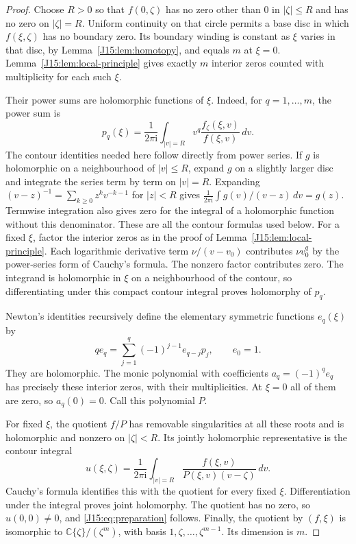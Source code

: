\documentclass[11pt,oneside]{report}
\theoremstyle{definition}
\numberwithin{equation}{section}
\newcommand{\C}{\mathbb C}
\newcommand{\ii}{\mathrm i}
\begin{document}
\begin{proof}
Choose $R>0$ so that $f(0,\zeta)$ has no zero other than $0$ in
$|\zeta|\le R$ and has no zero on $|\zeta|=R$.
Uniform continuity on that circle permits a base disc in which
$f(\xi,\zeta)$ has no boundary zero. Its boundary winding is constant
as $\xi$ varies in that disc, by Lemma~\ref{J15:lem:homotopy}, and equals
$m$ at $\xi=0$. Lemma~\ref{J15:lem:local-principle} gives exactly $m$
interior zeros counted with multiplicity for each such $\xi$.

Their power sums are holomorphic functions of $\xi$. Indeed, for
$q=1,\ldots,m$, the power sum is
\[
 p_q(\xi)=\frac1{2\pi\ii}
    \int_{|v|=R}v^q\frac{f_\zeta(\xi,v)}{f(\xi,v)}\,dv.
\]
The contour identities needed here follow directly from power series.
If $g$ is holomorphic on a neighbourhood of $|v|\le R$, expand $g$
on a slightly larger disc and integrate the series term by term on
$|v|=R$. Expanding $(v-z)^{-1}=\sum_{k\ge0}z^k v^{-k-1}$ for
$|z|<R$ gives
$\frac1{2\pi\ii}\int g(v)/(v-z)\,dv=g(z)$.
Termwise integration also gives zero for the integral of a holomorphic
function without this denominator. These are all the contour formulas
used below.
For a fixed $\xi$, factor the interior zeros as in the proof of
Lemma~\ref{J15:lem:local-principle}. Each logarithmic derivative term
$\nu/(v-v_0)$ contributes $\nu v_0^q$ by the power-series form of
Cauchy's formula. The nonzero factor contributes zero.
The integrand is holomorphic in $\xi$ on a neighbourhood of the contour,
so differentiating under this compact contour integral proves holomorphy
of $p_q$.

Newton's identities recursively define the elementary symmetric functions
$e_q(\xi)$ by
\[
 q e_q=\sum_{j=1}^q(-1)^{j-1}e_{q-j}p_j,\qquad e_0=1.
\]
They are holomorphic. The monic polynomial with coefficients
$a_q=(-1)^q e_q$ has precisely these interior zeros, with their
multiplicities. At $\xi=0$ all of them are zero, so $a_q(0)=0$.
Call this polynomial $P$.

For fixed $\xi$, the quotient $f/P$ has removable singularities at
all these roots and is holomorphic and nonzero on $|\zeta|<R$.
Its jointly holomorphic representative is the contour integral
\[
 u(\xi,\zeta)=\frac1{2\pi\ii}
  \int_{|v|=R}\frac{f(\xi,v)}{P(\xi,v)(v-\zeta)}\,dv.
\]
Cauchy's formula identifies this with the quotient for every fixed
$\xi$. Differentiation under the integral proves joint holomorphy.
The quotient has no zero, so $u(0,0)\ne0$, and \eqref{J15:eq:preparation}
follows.
Finally, the quotient by $(f,\xi)$ is isomorphic to
$\C\{\zeta\}/(\zeta^m)$, with basis
$1,\zeta,\ldots,\zeta^{m-1}$. Its dimension is $m$.
\end{proof}
\end{document}
